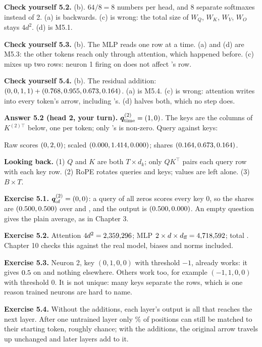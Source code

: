 \textbf{Check yourself 5.2.} (b). $64/8=8$ numbers per head, and 8 separate softmaxes instead of 2. (a) is
backwards. (c) is wrong: the total size of $W_Q$, $W_K$, $W_V$, $W_O$ stays $4d^2$. (d) is M5.1.

\textbf{Check yourself 5.3.} (b). The MLP reads one row at a time. (a) and (d) are M5.3: the other tokens reach
 only through attention, which happened before. (c) mixes up two rows: neuron 1 firing on 
does not affect 's row.

\textbf{Check yourself 5.4.} (b). The residual addition: $(0,0,1,1)+(0.768, 0.955, 0.673, 0.164)$. (a) is M5.4. (c) is wrong:
attention writes into every token's arrow, including 's. (d) halves both, which no step does.

\textbf{Answer 5.2 (head 2, your turn).} $\bm{q}^{(2)}_{\text{time}}=(1, 0)$. The keys are the
columns of $K^{(2)\top}$ below, one per token; only 's is non-zero. Query against keys:

\begin{center}
\fitwidthFourFive{}
\end{center}

\noindent Raw scores $(0, 2, 0)$; scaled $(0.000, 1.414, 0.000)$; shares
$(0.164, 0.673, 0.164)$.

\textbf{Looking back.} (1) $Q$ and $K$ are both $T\times d_k$; only $QK^\top$ pairs each query row with each key
row. (2) RoPE rotates queries and keys; values are left alone. (3) $B\times T$.

\textbf{Exercise 5.1.} $\bm{q}^{(2)}_{\text{of}}=(0, 0)$: a query of all zeros scores every key 0, so the
shares are $(0.500, 0.500)$ over  and , and the output is $(0.500, 0.000)$. An empty question
gives the plain average, as in Chapter 3.

\textbf{Exercise 5.2.} Attention $4d^2=2{,}359{,}296$; MLP $2\times d\times d_{\text{ff}}=4{,}718{,}592$; total
\nFiveGptBlock. Chapter 10 checks this against the real model, biases and norms included.

\textbf{Exercise 5.3.} Neuron 2, key $(0,1,0,0)$ with threshold $-1$, already works: it gives $0.5$ on 
and nothing elsewhere. Others work too, for example $(-1,1,0,0)$ with threshold $0$. It is not unique: many keys
separate the rows, which is one reason trained neurons are hard to name.

\textbf{Exercise 5.4.} Without the additions, each layer's output is all that reaches the next layer. After one
untrained layer only \nFiveIdNoResOne\% of positions can still be matched to their starting token, roughly chance;
with the additions, the original arrow travels up unchanged and later layers add to it.
\normalsize

